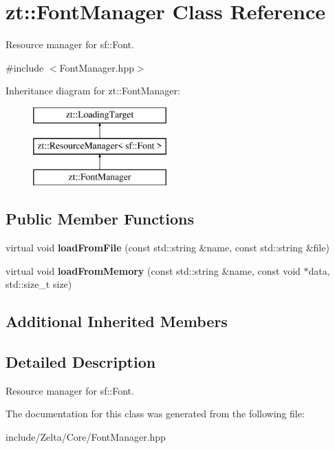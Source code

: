 \hypertarget{classzt_1_1_font_manager}{}\section{zt\+:\+:Font\+Manager Class Reference}
\label{classzt_1_1_font_manager}


Resource manager for sf\+::\+Font.  




{\ttfamily \#include $<$Font\+Manager.\+hpp$>$}

Inheritance diagram for zt\+:\+:Font\+Manager\+:\begin{figure}[H]
\begin{center}
\leavevmode
\includegraphics[height=3.000000cm]{classzt_1_1_font_manager}
\end{center}
\end{figure}
\subsection*{Public Member Functions}
\begin{DoxyCompactItemize}
\item 
\mbox{\label{classzt_1_1_font_manager_aa6fec447efd9a704bb38996264db7397}} 
virtual void {\bfseries load\+From\+File} (const std\+::string \&name, const std\+::string \&file)
\item 
\mbox{\label{classzt_1_1_font_manager_a499f87da8cf45045869b7e018b2ed150}} 
virtual void {\bfseries load\+From\+Memory} (const std\+::string \&name, const void $\ast$data, std\+::size\+\_\+t size)
\end{DoxyCompactItemize}
\subsection*{Additional Inherited Members}


\subsection{Detailed Description}
Resource manager for sf\+::\+Font. 

The documentation for this class was generated from the following file\+:\begin{DoxyCompactItemize}
\item 
include/\+Zelta/\+Core/Font\+Manager.\+hpp\end{DoxyCompactItemize}
